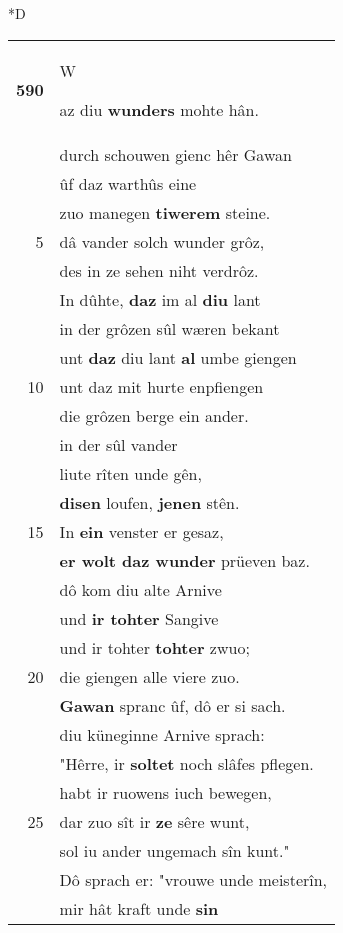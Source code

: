 \documentclass[8pt,a4paper,notitlepage]{article}
\begin{document}
\begin{table}[ht]
\begin{minipage}[t]{0.5\linewidth}
\small
\begin{center}*D
\end{center}
\begin{tabular}{rl}
\textbf{590} & \begin{large}W\end{large}az diu \textbf{wunders} mohte hân.\\ 
 & durch schouwen gienc hêr Gawan\\ 
 & ûf daz warthûs eine\\ 
 & zuo manegen \textbf{tiwerem} steine.\\ 
5 & dâ vander solch wunder grôz,\\ 
 & des in ze sehen niht verdrôz.\\ 
 & In dûhte, \textbf{daz} im al \textbf{diu} lant\\ 
 & in der grôzen sûl wæren bekant\\ 
 & unt \textbf{daz} diu lant \textbf{al} umbe giengen\\ 
10 & unt daz mit hurte enpfiengen\\ 
 & die grôzen berge ein ander.\\ 
 & in der sûl vander\\ 
 & liute rîten unde gên,\\ 
 & \textbf{disen} loufen, \textbf{jenen} stên.\\ 
15 & In \textbf{ein} venster er gesaz,\\ 
 & \textbf{er wolt daz wunder} prüeven baz.\\ 
 & dô kom diu alte Arnive\\ 
 & und \textbf{ir tohter} Sangive\\ 
 & und ir tohter \textbf{tohter} zwuo;\\ 
20 & die giengen alle viere zuo.\\ 
 & \textbf{Gawan} spranc ûf, dô er si sach.\\ 
 & diu küneginne Arnive sprach:\\ 
 & "Hêrre, ir \textbf{soltet} noch slâfes pflegen.\\ 
 & habt ir ruowens iuch bewegen,\\ 
25 & dar zuo sît ir \textbf{ze} sêre wunt,\\ 
 & sol iu ander ungemach sîn kunt."\\ 
 & Dô sprach er: "vrouwe unde meisterîn,\\ 
 & mir hât kraft unde \textbf{sin}\\ 

\end{tabular}
\end{minipage}
\end{table}
\end{document}
